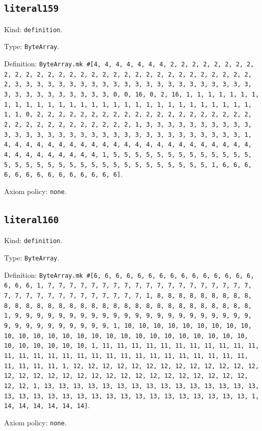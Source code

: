 \documentclass[11pt]{article}
\begin{document}
\subsection*{\texttt{literal159}}
\noindent Kind: \texttt{definition}.\par
\noindent Type: \texttt{ByteArray}.\par
\noindent Definition: \texttt{ByteArray.mk \#[4, 4, 4, 4, 4, 4, 4, 2, 2, 2, 2, 2, 2, 2, 2, 2, 2, 2, 2, 2, 2, 2, 2, 2, 2, 2, 2, 2, 2, 2, 2, 2, 2, 2, 2, 2, 2, 2, 2, 3, 3, 3, 3, 3, 3, 3, 3, 3, 3, 3, 3, 3, 3, 3, 3, 3, 3, 3, 3, 3, 3, 3, 3, 3, 3, 3, 3, 3, 3, 3, 3, 0, 0, 16, 0, 2, 16, 1, 1, 1, 1, 1, 1, 1, 1, 1, 1, 1, 1, 1, 1, 1, 1, 1, 1, 1, 1, 1, 1, 1, 1, 1, 1, 1, 1, 1, 1, 1, 1, 0, 2, 2, 2, 2, 2, 2, 2, 2, 2, 2, 2, 2, 2, 2, 2, 2, 2, 2, 2, 2, 2, 2, 2, 2, 2, 2, 2, 2, 2, 2, 2, 2, 1, 3, 3, 3, 3, 3, 3, 3, 3, 3, 3, 3, 3, 3, 3, 3, 3, 3, 3, 3, 3, 3, 3, 3, 3, 3, 3, 3, 3, 3, 3, 3, 3, 1, 4, 4, 4, 4, 4, 4, 4, 4, 4, 4, 4, 4, 4, 4, 4, 4, 4, 4, 4, 4, 4, 4, 4, 4, 4, 4, 4, 4, 4, 4, 4, 4, 1, 5, 5, 5, 5, 5, 5, 5, 5, 5, 5, 5, 5, 5, 5, 5, 5, 5, 5, 5, 5, 5, 5, 5, 5, 5, 5, 5, 5, 5, 5, 5, 5, 1, 6, 6, 6, 6, 6, 6, 6, 6, 6, 6, 6, 6, 6, 6]}.\par
\noindent Axiom policy: \texttt{none}.\par
\subsection*{\texttt{literal160}}
\noindent Kind: \texttt{definition}.\par
\noindent Type: \texttt{ByteArray}.\par
\noindent Definition: \texttt{ByteArray.mk \#[6, 6, 6, 6, 6, 6, 6, 6, 6, 6, 6, 6, 6, 6, 6, 6, 6, 6, 1, 7, 7, 7, 7, 7, 7, 7, 7, 7, 7, 7, 7, 7, 7, 7, 7, 7, 7, 7, 7, 7, 7, 7, 7, 7, 7, 7, 7, 7, 7, 7, 7, 1, 8, 8, 8, 8, 8, 8, 8, 8, 8, 8, 8, 8, 8, 8, 8, 8, 8, 8, 8, 8, 8, 8, 8, 8, 8, 8, 8, 8, 8, 8, 8, 8, 1, 9, 9, 9, 9, 9, 9, 9, 9, 9, 9, 9, 9, 9, 9, 9, 9, 9, 9, 9, 9, 9, 9, 9, 9, 9, 9, 9, 9, 9, 9, 9, 9, 1, 10, 10, 10, 10, 10, 10, 10, 10, 10, 10, 10, 10, 10, 10, 10, 10, 10, 10, 10, 10, 10, 10, 10, 10, 10, 10, 10, 10, 10, 10, 10, 10, 1, 11, 11, 11, 11, 11, 11, 11, 11, 11, 11, 11, 11, 11, 11, 11, 11, 11, 11, 11, 11, 11, 11, 11, 11, 11, 11, 11, 11, 11, 11, 11, 11, 1, 12, 12, 12, 12, 12, 12, 12, 12, 12, 12, 12, 12, 12, 12, 12, 12, 12, 12, 12, 12, 12, 12, 12, 12, 12, 12, 12, 12, 12, 12, 12, 12, 1, 13, 13, 13, 13, 13, 13, 13, 13, 13, 13, 13, 13, 13, 13, 13, 13, 13, 13, 13, 13, 13, 13, 13, 13, 13, 13, 13, 13, 13, 13, 13, 13, 1, 14, 14, 14, 14, 14, 14]}.\par
\noindent Axiom policy: \texttt{none}.\par
\end{document}
